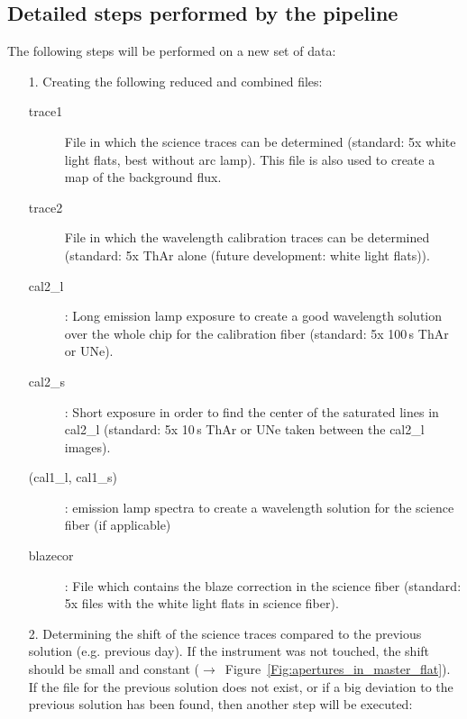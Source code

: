 \documentclass[10pt,a4paper]{article}
\begin{document}




\subsection{Detailed steps performed by the pipeline}
\label{Section:pipeline_steps_general}

\noindent The following steps will be performed on a new set of data:
\begin{itemize}
  \item[1.] Creating the following reduced and combined files:
  \begin{description}
    \item[trace1] File in which the science traces can be determined (standard: 5x white light flats, best without arc lamp). This file is also used to create a map of the background flux.
    \item[trace2] File in which the wavelength calibration traces can be determined (standard: 5x ThAr alone (future development: white light flats)).
    \item[cal2\_l]: Long emission lamp exposure to create a good wavelength solution over the whole chip for the calibration fiber (standard: 5x 100\,s ThAr or UNe).
    \item[cal2\_s]: Short exposure in order to find the center of the saturated lines in cal2\_l (standard: 5x 10\,s ThAr or UNe taken between the cal2\_l images).
    \item[(cal1\_l, cal1\_s)]: emission lamp spectra to create a wavelength solution for the science fiber (if applicable)
    \item[blazecor]: File which contains the blaze correction in the science fiber (standard: 5x files with the white light flats in science fiber).
  \end{description}
  \item[2.] Determining the shift of the science traces compared to the previous solution (e.g. previous day). If the instrument was not touched, the shift should be small and constant ($\rightarrow$~Figure~\ref{Fig:apertures_in_master_flat}). If the file for the previous solution does not exist, or if a big deviation to the previous solution has been found, then another step will be executed:

\end{itemize}
\end{document}
